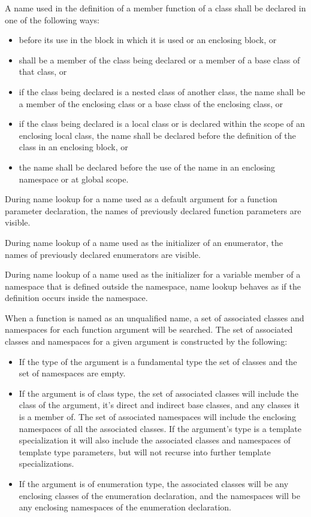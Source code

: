 \p A name used in the definition of a member function of a class shall be
declared in one of the following ways:

\begin{itemize}
\item before its use in the block in which it is used or an enclosing block, or
\item shall be a member of the class being declared or a member of a base class
of that class, or
\item if the class being declared is a nested class of another class, the name
shall be a member of the enclosing class or a base class of the enclosing class,
or
\item if the class being declared is a local class or is declared within the
scope of an enclosing local class, the name shall be declared before the
definition of the class in an enclosing block, or
\item the name shall be declared before the use of the name in an enclosing
namespace or at global scope.
\end{itemize}

\p During name lookup for a name used as a default argument for a function
parameter declaration, the names of previously declared function parameters are
visible.

\p During name lookup of a name used as the initializer of an enumerator, the
names of previously declared enumerators are visible.

\p During name lookup of a name used as the initializer for a variable member of
a namespace that is defined outside the namespace, name lookup behaves as if the
definition occurs inside the namespace.


\p When a function is named as an unqualified name, a set of associated classes
and namespaces for each function argument will be searched. The set of
associated classes and namespaces for a given argument is constructed by the
following:

\begin{itemize}
\item If the type of the argument is a fundamental type the set of classes and
the set of namespaces are empty.
\item If the argument is of class type, the set of associated classes will
include the class of the argument, it's direct and indirect base classes, and
any classes it is a member of. The set of associated namespaces will include the
enclosing namespaces of all the associated classes. If the argument's type is a
template specialization it will also include the associated classes and
namespaces of template type parameters, but will not recurse into further
template specializations.
\item If the argument is of enumeration type, the associated classes will be any
enclosing classes of the enumeration declaration, and the namespaces will be any
enclosing namespaces of the enumeration declaration.
\end{itemize}

